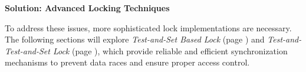 \highspace
\begin{flushleft}
    \textcolor{Green3}{ \textbf{Solution: Advanced Locking Techniques}}
\end{flushleft}
To address these issues, more sophisticated lock implementations are necessary. The following sections will explore \emph{Test-and-Set Based Lock} (page ) and \emph{Test-and-Test-and-Set Lock} (page ), which provide reliable and efficient synchronization mechanisms to prevent data races and ensure proper access control.
